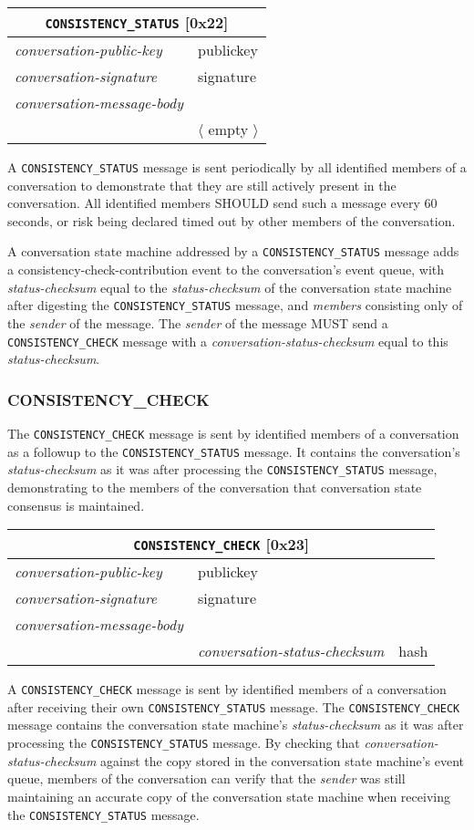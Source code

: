 \documentclass{article}
\def\npmessage#1{\texttt{#1}}
\def\field#1{\textit{#1}}
\def\smfield#1{\textsl{#1}}
\def\type#1{\textsf{#1}}
\newenvironment{conversationmessage}[2]{
\newcommand{\messagefield}[2]{
& \field{##1} & \type{##2} \\
\hline
}
\hspace{2em minus 2em}\begin{tabular}{|l|l|l|}
\hline
\multicolumn{3}{|c|}{\npmessage{#1} [#2]} \\
\hline
\hline
\field{conversation-public-key} & \multicolumn{2}{l|}{\type{publickey}} \\
\hline
\field{conversation-signature} & \multicolumn{2}{l|}{\type{signature}} \\
\hline
\field{conversation-message-body} & \multicolumn{2}{l|}{} \\
\hline
}{
\end{tabular}
}
\newcommand\emptyconversationmessage[2]{
\begin{conversationmessage}{#1}{#2}
& \multicolumn{2}{|l|}{ $\langle$ empty $\rangle$ } \\
\hline
\end{conversationmessage}
}
\begin{document}
\emptyconversationmessage{CONSISTENCY\_STATUS}{0x22}

A \npmessage{CONSISTENCY\_STATUS} message is sent periodically by all identified members of a conversation to demonstrate that they are still actively present in the conversation.
All identified members SHOULD send such a message every 60 seconds, or risk being declared timed out by other members of the conversation.

A conversation state machine addressed by a \npmessage{CONSISTENCY\_STATUS} message adds a \type{consistency-check-contribution} event to the conversation's event queue, with \smfield{status-checksum} equal to the \smfield{status-checksum} of the conversation state machine after digesting the \npmessage{CONSISTENCY\_STATUS} message, and \smfield{members} consisting only of the \field{sender} of the message.
The \field{sender} of the message MUST send a \npmessage{CONSISTENCY\_CHECK} message with a \field{conversation-status-checksum} equal to this \smfield{status-checksum}.


\subsubsection{CONSISTENCY\_CHECK}
\label{sec:messages/consistency-check}

The \npmessage{CONSISTENCY\_CHECK} message is sent by identified members of a conversation as a followup to the \npmessage{CONSISTENCY\_STATUS} message.
It contains the conversation's \smfield{status-checksum} as it was after processing the \npmessage{CONSISTENCY\_STATUS} message, demonstrating to the members of the conversation that conversation state consensus is maintained.

\begin{conversationmessage}{CONSISTENCY\_CHECK}{0x23}
\messagefield{conversation-status-checksum}{hash}
\end{conversationmessage}

A \npmessage{CONSISTENCY\_CHECK} message is sent by identified members of a conversation after receiving their own \npmessage{CONSISTENCY\_STATUS} message.
The \npmessage{CONSISTENCY\_CHECK} message contains the conversation state machine's \smfield{status-checksum} as it was after processing the \npmessage{CONSISTENCY\_STATUS} message.
By checking that \field{conversation-status-checksum} against the copy stored in the conversation state machine's event queue, members of the conversation can verify that the \field{sender} was still maintaining an accurate copy of the conversation state machine when receiving the \npmessage{CONSISTENCY\_STATUS} message.
\end{document}
